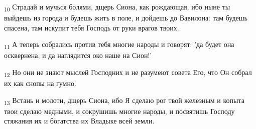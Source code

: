 \begin{tcolorbox}
\textsubscript{10} Страдай и мучься болями, дщерь Сиона, как рождающая, ибо ныне ты выйдешь из города и будешь жить в поле, и дойдешь до Вавилона: там будешь спасена, там искупит тебя Господь от руки врагов твоих.
\end{tcolorbox}
\begin{tcolorbox}
\textsubscript{11} А теперь собрались против тебя многие народы и говорят: 'да будет она осквернена, и да наглядится око наше на Сион!'
\end{tcolorbox}
\begin{tcolorbox}
\textsubscript{12} Но они не знают мыслей Господних и не разумеют совета Его, что Он собрал их как снопы на гумно.
\end{tcolorbox}
\begin{tcolorbox}
\textsubscript{13} Встань и молоти, дщерь Сиона, ибо Я сделаю рог твой железным и копыта твои сделаю медными, и сокрушишь многие народы, и посвятишь Господу стяжания их и богатства их Владыке всей земли.
\end{tcolorbox}
